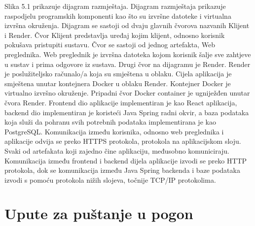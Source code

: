 			 \newpage
			 
			 Slika 5.1 prikazuje dijagram razmještaja. Dijagram razmještaja prikazuje raspodjelu programskih komponenti kao što su izvršne datoteke i virtualna izvršna okruženja. Dijagram se sastoji od dvaju glavnih čvorova nazvanih Klijent i Render. Čvor Klijent predstavlja uređaj kojim klijent, odnosno korisnik pokušava pristupiti sustavu. Čvor se sastoji od jednog artefakta, Web preglednika. Web preglednik je izvršna datoteka kojom korisnik šalje sve zahtjeve u sustav i prima odgovore iz sustava. Drugi čvor na dijagramu je Render. Render je poslužiteljsko računalo/a koja su smještena u oblaku. Cijela aplikacija je smještena unutar kontejnera Docker u oblaku Render. Kontejner Docker je virtualno izvršno okruženje. Pripadni čvor Docker container je ugniježđen unutar čvora Render. Frontend dio aplikacije implementiran je kao React aplikacija, backend dio implementiran je koristeći Java Spring radni okvir, a baza podataka koja služi da pohranu svih potrebnih podataka implementirana je kao PostgreSQL. Komunikacija između korisnika, odnosno web preglednika i aplikacije odvija se preko HTTPS protokola, protokola na aplikacijskom sloju. Svaki od artefakata koji zajedno čine aplikaciju, međusobno komuniciraju. Komunikacija između frontend i backend dijela aplikacije izvodi se preko HTTP protokola, dok se komunikacija između Java Spring backenda i baze podataka izvodi s pomoću protokola nižih slojeva, točnije TCP/IP protokolima.
			
			\eject 
		
		\section{Upute za puštanje u pogon}
		
		
			
